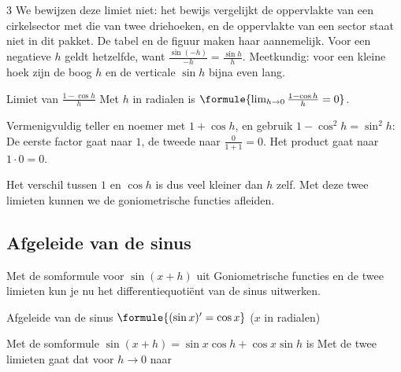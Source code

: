 \begin{alleenvoor}{3}
We bewijzen deze limiet niet: het bewijs vergelijkt de oppervlakte van een cirkelsector met die van twee driehoeken, en de oppervlakte van een sector staat niet in dit pakket. De tabel en de figuur maken haar aannemelijk. Voor een negatieve $h$ geldt hetzelfde, want $\frac{\sin(-h)}{-h} = \frac{\sin h}{h}$. Meetkundig: voor een kleine hoek zijn de boog $h$ en de verticale $\sin h$ bijna even lang.

\begin{theorie}
\begin{stelling}{Limiet van \texorpdfstring{$\frac{1 - \cos h}{h}$}{(1 - cos h)/h}}
Met $h$ in radialen is \quad $\formule{\lim_{h \to 0} \frac{1 - \cos h}{h} = 0}$.
\end{stelling}
\begin{bewijs}
Vermenigvuldig teller en noemer met $1 + \cos h$, en gebruik $1 - \cos^2 h = \sin^2 h$:
De eerste factor gaat naar $1$, de tweede naar $\frac{0}{1 + 1} = 0$. Het product gaat naar $1 \cdot 0 = 0$.
\end{bewijs}
\end{theorie}

Het verschil tussen $1$ en $\cos h$ is dus veel kleiner dan $h$ zelf. Met deze twee limieten kunnen we de goniometrische functies afleiden.

\subsection{Afgeleide van de sinus}

Met de somformule voor $\sin(x + h)$ uit Goniometrische functies en de twee limieten kun je nu het differentiequotiënt van de sinus uitwerken.

\begin{theorie}
\begin{stelling}{Afgeleide van de sinus}
$\formule{(\sin x)' = \cos x}$ \qquad ($x$ in radialen)
\end{stelling}
\begin{bewijs}
Met de somformule $\sin(x + h) = \sin x\cos h + \cos x\sin h$ is
Met de twee limieten gaat dat voor $h \to 0$ naar
\end{bewijs}
\end{theorie}


\end{alleenvoor}
